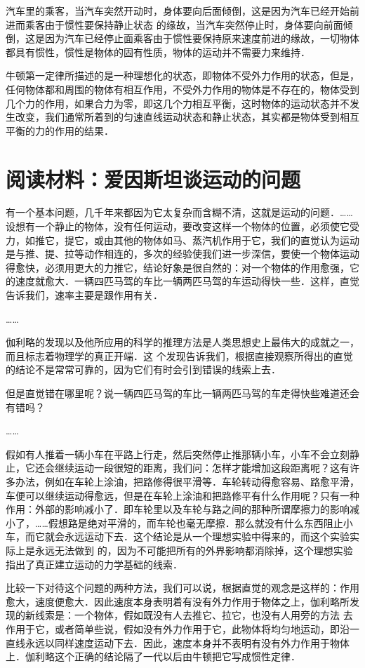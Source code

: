 汽车里的乘客，当汽车突然开动时，身体要向后面倾倒，这是因为汽车已经开始前进而乘客由于惯性要保持静止状态
的缘故，当汽车突然停止时，身体要向前面倾倒，这是因为汽车已经停止面乘客由于惯性要保持原来速度前进的缘故，一切物体都具有惯性，惯性是物体的固有性质，物体的运动并不需要力来维持．

牛顿第一定律所描述的是一种理想化的状态，即物体不受外力作用的状态，但是，任何物体都和周围的物体有相互作用，不受外力作用的物体是不存在的，物体受到几个力的作用，如果合力为零，即这几个力相互平衡，这时物体的运动状态并不发生改变，我们通常所着到的匀速直线运动状态和静止状态，其实都是物体受到相互平衡的力的作用的结果．

\section*{阅读材料：爱因斯坦谈运动的问题}
有一个基本问题，几千年来都因为它太复杂而含糊不清，这就是运动的问题．……设想有一个静止的物体，没有任何运动，要改变这样一个物体的位置，必须使它受力，如推它，提它，或由其他的物体如马、蒸汽机作用于它，我们的直觉认为运动是与推、提、拉等动作相连的，多次的经验使我们进一步深信，要使一个物体运动得愈快，必须用更大的力推它，结论好象是很自然的：对一个物体的作用愈强，它的速度就愈大．一辆四匹马驾的车比一辆两匹马驾的车运动得快一些．这样，直觉告诉我们，速率主要是跟作用有关．

……

伽利略的发现以及他所应用的科学的推理方法是人类思想史上最伟大的成就之一，而且标志着物理学的真正开端．这
个发现告诉我们，根据直接观察所得出的直觉的结论不是常常可靠的，因为它们有时会引到错误的线索上去．

但是直觉错在哪里呢？说一辆四匹马驾的车比一辆两匹马驾的车走得快些难道还会有错吗？

……

假如有人推着一辆小车在平路上行走，然后突然停止推那辆小车，小车不会立刻静止，它还会继续运动一段很短的距离，我们问：怎样才能增加这段距离呢？这有许多办法，例如在车轮上涂油，把路修得很平滑等．车轮转动得愈容易、路愈平滑，车便可以继续运动得愈远，但是在车轮上涂油和把路修平有什么作用呢？只有一种作用：外部的影响减小了．即车轮里以及车轮与路之间的那种所谓摩擦力的影响减小了，……假想路是绝对平滑的，而车轮也毫无摩擦．那么就没有什么东西阻止小车，而它就会永远运动下去．这个结论是从一个理想实验中得来的，而这个实验实际上是永远无法做到
的，因为不可能把所有的外界影响都消除掉，这个理想实验指出了真正建立运动的力学基础的线索．

比较一下对待这个问题的两种方法，我们可以说，根据直觉的观念是这样的：作用愈大，速度便愈大．因此速度本身表明着有没有外力作用于物体之上，伽利略所发现的新线索是：一个物体，假如既没有人去推它、拉它，也没有人用旁的方法
去作用于它，或者简单些说，假如没有外力作用于它，此物体将均匀地运动，即沿一直线永远以同样速度运动下去．因此，速度本身并不表明有没有外力作用于物体上．伽利略这个正确的结论隔了一代以后由牛顿把它写成惯性定律．

